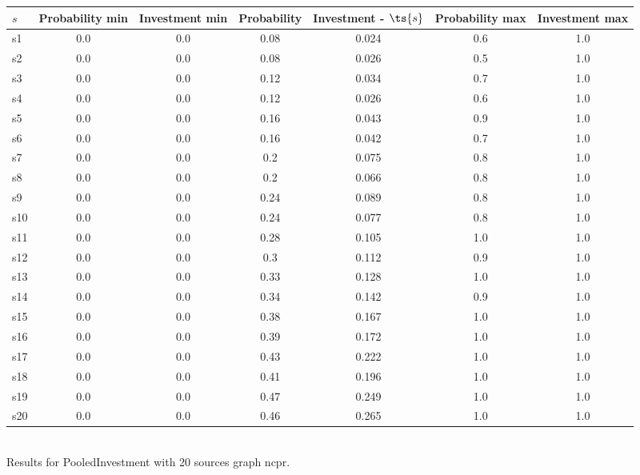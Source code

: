 \documentclass{article}
\begin{document}
\noindent\begin{tabular}{|l|c|c|c|c|c|c|}
\hline
$s$& Probability min & Investment min & Probability & Investment - $\ts{s}$ & Probability max & Investment max\\
\hline
s1 &0.0 & 0.0 & 0.08 & 0.024 & 0.6 & 1.0\\
\hline
s2 &0.0 & 0.0 & 0.08 & 0.026 & 0.5 & 1.0\\
\hline
s3 &0.0 & 0.0 & 0.12 & 0.034 & 0.7 & 1.0\\
\hline
s4 &0.0 & 0.0 & 0.12 & 0.026 & 0.6 & 1.0\\
\hline
s5 &0.0 & 0.0 & 0.16 & 0.043 & 0.9 & 1.0\\
\hline
s6 &0.0 & 0.0 & 0.16 & 0.042 & 0.7 & 1.0\\
\hline
s7 &0.0 & 0.0 & 0.2 & 0.075 & 0.8 & 1.0\\
\hline
s8 &0.0 & 0.0 & 0.2 & 0.066 & 0.8 & 1.0\\
\hline
s9 &0.0 & 0.0 & 0.24 & 0.089 & 0.8 & 1.0\\
\hline
s10 &0.0 & 0.0 & 0.24 & 0.077 & 0.8 & 1.0\\
\hline
s11 &0.0 & 0.0 & 0.28 & 0.105 & 1.0 & 1.0\\
\hline
s12 &0.0 & 0.0 & 0.3 & 0.112 & 0.9 & 1.0\\
\hline
s13 &0.0 & 0.0 & 0.33 & 0.128 & 1.0 & 1.0\\
\hline
s14 &0.0 & 0.0 & 0.34 & 0.142 & 0.9 & 1.0\\
\hline
s15 &0.0 & 0.0 & 0.38 & 0.167 & 1.0 & 1.0\\
\hline
s16 &0.0 & 0.0 & 0.39 & 0.172 & 1.0 & 1.0\\
\hline
s17 &0.0 & 0.0 & 0.43 & 0.222 & 1.0 & 1.0\\
\hline
s18 &0.0 & 0.0 & 0.41 & 0.196 & 1.0 & 1.0\\
\hline
s19 &0.0 & 0.0 & 0.47 & 0.249 & 1.0 & 1.0\\
\hline
s20 &0.0 & 0.0 & 0.46 & 0.265 & 1.0 & 1.0\\
\hline
\end{tabular}\\

\noindent Results for PooledInvestment with 20 sources graph ncpr.
\end{document}

